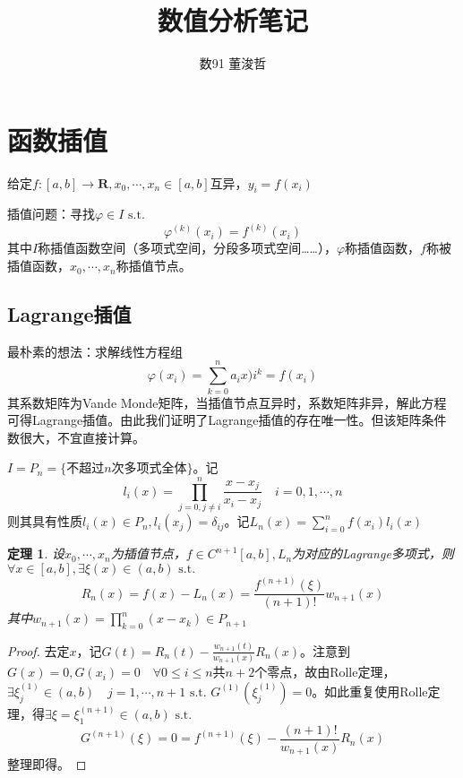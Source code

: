 \documentclass{ctexart}
\title{数值分析笔记}
\author{数91 董浚哲}
\begin{document}
\maketitle
\newcommand{\R}{\mathbf{R}}
\newcommand{\dd}{\,\mathrm{d}}
\newcommand{\st}{\text{ s.t. }}
\newcommand{\pp}[2]{\frac{\partial #1}{\partial #2}}
\newcommand{\fl}{\mathrm{fl}}
\newcommand{\nm}[1]{\left\|#1 \right\|}
\newcommand{\dif}[2]{\frac{\mathrm{d}#1}{\mathrm{d}#2}}

\newtheorem{Thm}{定理}[section]
\newtheorem{Lemma}[Thm]{引理}
\newtheorem{Prop}[Thm]{命题}
\newtheorem{Cor}[Thm]{推论}
\newtheorem{Def}{定义}[section]
\newtheorem{Rmk}{注}[section]
\newtheorem{Eg}{例}[section]
\newenvironment{solution}{\begin{proof}[Solution]}{\end{proof}}

\section{函数插值}
给定$f:[a,b]\to \R,x_0,\cdots, x_n\in [a,b]$互异，$y_i=f(x_i)$

插值问题：寻找$\varphi\in I\st$
\[\varphi^{(k)}(x_i)=f^{(k)}(x_i)\]
其中$I$称插值函数空间（多项式空间，分段多项式空间……），$\varphi$称插值函数，$f$称被插值函数，$x_0,\cdots,x_n$称插值节点。

\subsection{Lagrange插值}
最朴素的想法：求解线性方程组
\[\varphi(x_i)=\sum_{k=0}^n a_ix)i^k=f(x_i)\]
其系数矩阵为Vande Monde矩阵，当插值节点互异时，系数矩阵非异，解此方程可得Lagrange插值。由此我们证明了Lagrange插值的存在唯一性。但该矩阵条件数很大，不宜直接计算。

$I=P_n=\{\text{不超过}n\text{次多项式全体}\}$。记
\[l_i(x)=\prod\limits_{j=0,j\neq i}^n\frac{x-x_j}{x_i-x_j}\quad i=0,1,\cdots,n\]
则其具有性质$l_i(x)\in P_n,l_i(x_j)=\delta_{ij}$。记$L_n(x)=\sum_{i=0}^n f(x_i)l_i(x)$

\begin{Thm}
设$x_0,\cdots, x_n$为插值节点，$f\in C^{n+1}[a,b],L_n$为对应的Lagrange多项式，则$\forall x\in [a,b],\exists \xi(x)\in (a,b)\st $
\[R_n(x)=f(x)-L_n(x)=\frac{f^{(n+1)}(\xi)}{(n+1)!}w_{n+1}(x)\]
其中$w_{n+1}(x)=\prod_{k=0}^n(x-x_k)\in P_{n+1}$
\end{Thm}

\begin{proof}
去定$x$，记$G(t)=R_n(t)-\frac{w_{n+1}(t)}{w_{n+1}(x)}R_n(x)$。注意到$G(x)=0,G(x_i)=0\quad\forall 0\leq i\leq n$共$n+2$个零点，故由Rolle定理，$\exists \xi_j^{(1)}\in (a,b)\quad j=1,\cdots,n+1\st G^{(1)}(\xi_j^{(1)})=0$。如此重复使用Rolle定理，得$\exists \xi=\xi^{(n+1)}_1\in (a,b)\st $
\[G^{(n+1)}(\xi)=0=f^{(n+1)}(\xi)-\frac{(n+1)!}{w_{n+1}(x)}R_n(x)\]
整理即得。
\end{proof}
\end{document}

